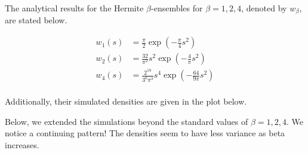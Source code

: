 
\newpage


The analytical results for the Hermite $\beta$-ensembles for $\beta = 1, 2, 4$, denoted by $w_\beta$, are stated below.

\begin{align*}
  w_1(s) &= \frac{\pi}{2} \exp(-\frac{\pi}{4}s^2) \\
  w_2(s) &= \frac{32}{\pi^2} s^2 \exp(-\frac{4}{\pi}s^2) \\
  w_4(s) &= \frac{2^{18}}{3^{6}\pi^3} s^4 \exp(-\frac{64}{9\pi}s^2) \\
\end{align*}

Additionally, their simulated densities are given in the plot below.




\newpage


Below, we extended the simulations beyond the standard values of $\beta = 1,2,4$. We notice a continuing pattern! The densities seem to have less variance as
beta increases.

